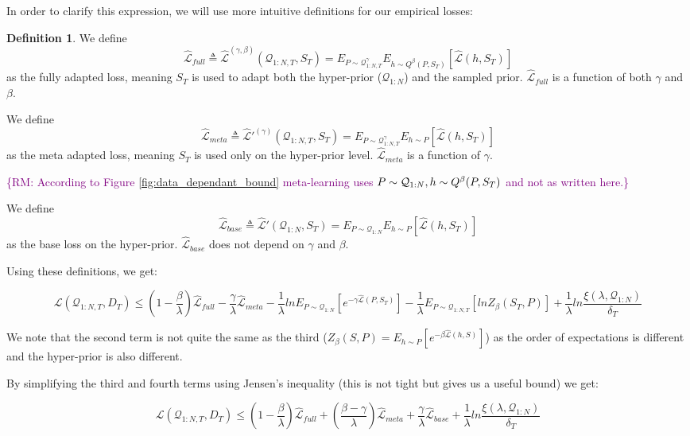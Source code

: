 \documentclass[letterpaper]{article}
\theoremstyle{definition}
\newtheorem{defn}{Definition}[section]
\newcommand{\RMM}[1]{\textcolor{purple}{\{RM: #1\}}}
\begin{document}
In order to clarify this expression, we will use more intuitive definitions for our empirical losses:
\begin{defn}
	We define $$\hat{\mathcal{L}}_{full}\triangleq \hat{\mathcal{L}}^{(\gamma,\beta)}(\mathcal{Q}_{1:N,T}, S_T)=E_{P\sim \mathcal{Q}^{\gamma}_{1:N,T}}E_{h\sim Q^{\beta}(P,S_T)}\left [\hat{\mathcal{L}}(h, S_T)\right ]$$ as the fully adapted loss, meaning $S_T$ is used to adapt both the hyper-prior ($\mathcal{Q}_{1:N}$) and the sampled prior. $\hat{\mathcal{L}}_{full}$ is a function of both $\gamma$ and $\beta$.
	
	We define 
	$$\hat{\mathcal{L}}_{meta}\triangleq \hat{\mathcal{L}}'^{(\gamma)}(\mathcal{Q}_{1:N,T}, S_T)=E_{P\sim \mathcal{Q}^{\gamma}_{1:N,T}}E_{h\sim P}\left [\hat{\mathcal{L}}(h, S_T)\right ]$$ 
	as the meta adapted loss, meaning $S_T$ is used only on the hyper-prior level. $\hat{\mathcal{L}}_{meta}$ is a function of $\gamma$.
	
	\RMM{According to Figure \ref{fig:data_dependant_bound} meta-learning uses $P\sim {\cal Q}_{1:N},h\sim Q^\beta(P,S_T)$ and not as written here.}
	
	We define $$\hat{\mathcal{L}}_{base}\triangleq \hat{\mathcal{L}}'(\mathcal{Q}_{1:N}, S_T)=E_{P\sim \mathcal{Q}_{1:N}}E_{h\sim P}\left [\hat{\mathcal{L}}(h, S_T)\right ]$$ as the base loss on the hyper-prior. $\hat{\mathcal{L}}_{base}$ does not depend on $\gamma$ and $\beta$.
\end{defn}
 
 Using these definitions, we get:

$$\mathcal{L}(\mathcal{Q}_{1:N,T}, D_T) \leq (1-\frac{\beta}{\lambda})\hat{\mathcal{L}}_{full} -\frac{\gamma}{\lambda}\hat{\mathcal{L}}_{meta} - \frac{1}{\lambda}lnE_{P\sim \mathcal{Q}_{1:N}}\left [e^{-\gamma\hat{\mathcal{L}}(P,S_T)}\right ]-\frac{1}{\lambda}E_{P\sim \mathcal{Q}_{1:N,T}}\left [lnZ_{\beta}(S_T,P)\right ]+\frac{1}{\lambda}ln\frac{\xi(\lambda,\mathcal{Q}_{1:N})}{\delta_T}$$

We note that the second term is not quite the same as the third ($Z_\beta(S,P)=E_{h\sim P} \left [ e^{-\beta\hat{\mathcal{L}}(h,S)}\right ]$) as the order of expectations is different and the hyper-prior is also different. 

By simplifying the third and fourth terms using Jensen's inequality (this is not tight but gives us a useful bound) we get:

\begin{equation} \label{eq:pb-adapt-multi}
\mathcal{L}(\mathcal{Q}_{1:N,T}, D_T) \leq 
(1-\frac{\beta}{\lambda})\hat{\mathcal{L}}_{full} +(\frac{\beta-\gamma}{\lambda})\hat{\mathcal{L}}_{meta} + \frac{\gamma}{\lambda}\hat{\mathcal{L}}_{base} +\frac{1}{\lambda}ln\frac{\xi(\lambda,\mathcal{Q}_{1:N})}{\delta_T}
\end{equation}
\end{document}
